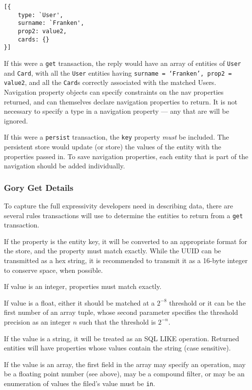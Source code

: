 \documentclass{article}
\newcommand{\ilcode}{\tt}
\begin{document}
\linespread{1}
\begin{lstlisting}
[{
	type: `User',
	surname: `Franken',
	prop2: value2,
	cards: {}
}]
\end{lstlisting}
\linespread{1.6}

If this were a {\ilcode get} transaction, the reply would have an array of
entities of {\ilcode User} and {\ilcode Card}, with all the {\ilcode User}
entities having {\ilcode surname = `Franken', prop2 = value2}, and all the
{\ilcode Card}s correctly associated with the matched Users.  Navigation
property objects can specify constraints on the nav properties returned, and can
themselves declare navigation properties to return. It is not necessary to
specify a type in a navigation property --- any that are will be ignored.

If this were a {\ilcode persist} transaction, the {\ilcode key} property {\it must} be
included. The persistent store would update (or store) the values of the entity
with the properties passed in. To save navigation properties, each entity that
is part of the navigation should be added individually.

\subsubsection{Gory Get Details}
To capture the full expressivity developers need in describing data, there are
several rules transactions will use to determine the entities to return from a
{\ilcode get} transaction.

If the property is the entity key, it will be
converted to an appropriate format for the store, and the property must match
exactly. While the UUID can be transmitted as a hex string, it is recommended to
transmit it as a 16-byte integer to conserve space, when possible.

If value is an integer, properties must match exactly.

If value is a float, either it should be matched at a $2^{-8}$ threshold or it
can be the first number of an array tuple, whose second parameter specifies the
threshold precision as an integer $n$ such that the threshold is $2^{-n}$.

If the value is a string, it will be treated as an SQL LIKE operation.
Returned entities will have properties whose values contain the string (case
sensitive).

If the value is an array, the first field in the array may specify an operation,
may be a floating point number (see above), may be a compound filter, or may be
an enumeration of values the filed's value must be {\ilcode in}.
\end{document}
